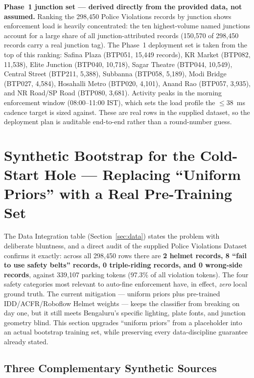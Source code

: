 \documentclass[11pt,a4paper]{article}
\begin{document}
\textbf{Phase~1 junction set --- derived directly from the provided data, not assumed.} Ranking the 298,450 Police Violations records by junction shows enforcement load is heavily concentrated: the ten highest-volume named junctions account for a large share of all junction-attributed records (150,570 of 298,450 records carry a real junction tag). The Phase~1 deployment set is taken from the top of this ranking: Safina Plaza (BTP051, 15{,}449 records), KR Market (BTP082, 11{,}538), Elite Junction (BTP040, 10{,}718), Sagar Theatre (BTP044, 10{,}549), Central Street (BTP211, 5{,}388), Subbanna (BTP058, 5{,}189), Modi Bridge (BTP027, 4{,}584), Hosahalli Metro (BTP020, 4{,}101), Anand Rao (BTP057, 3{,}935), and NR Road/SP Road (BTP080, 3{,}681). Activity peaks in the morning enforcement window (08:00--11:00 IST), which sets the load profile the $\leq$38~ms cadence target is sized against. These are real rows in the supplied dataset, so the deployment plan is auditable end-to-end rather than a round-number guess.

\section{Synthetic Bootstrap for the Cold-Start Hole — Replacing ``Uniform Priors'' with a Real Pre-Training Set}
\label{sec:synthetic}

\noindent The Data Integration table (Section~\ref{sec:data}) states the problem with deliberate bluntness, and a direct audit of the supplied Police Violations Dataset confirms it exactly: across all 298{,}450 rows there are \textbf{2 helmet records, 8 ``fail to use safety belts'' records, 0 triple-riding records, and 0 wrong-side records}, against 339{,}107 parking tokens (97.3\% of all violation tokens). The four safety categories most relevant to auto-fine enforcement have, in effect, \emph{zero} local ground truth. The current mitigation --- uniform priors plus pre-trained IDD/ACFR/Roboflow Helmet weights --- keeps the classifier from breaking on day one, but it still meets Bengaluru's specific lighting, plate fonts, and junction geometry blind. This section upgrades ``uniform priors'' from a placeholder into an actual bootstrap training set, while preserving every data-discipline guarantee already stated.

\subsection*{Three Complementary Synthetic Sources}
\end{document}
